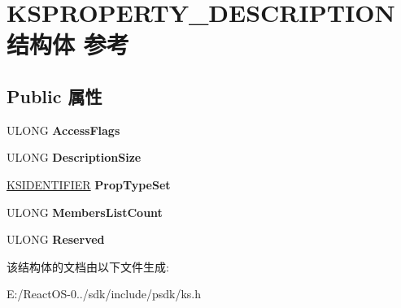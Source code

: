\hypertarget{struct_k_s_p_r_o_p_e_r_t_y___d_e_s_c_r_i_p_t_i_o_n}{}\section{K\+S\+P\+R\+O\+P\+E\+R\+T\+Y\+\_\+\+D\+E\+S\+C\+R\+I\+P\+T\+I\+O\+N结构体 参考}
\label{struct_k_s_p_r_o_p_e_r_t_y___d_e_s_c_r_i_p_t_i_o_n}
\subsection*{Public 属性}
\begin{DoxyCompactItemize}
\item 
\mbox{\label{struct_k_s_p_r_o_p_e_r_t_y___d_e_s_c_r_i_p_t_i_o_n_a9e931183967a877613638f1cb2b29eb6}} 
U\+L\+O\+NG {\bfseries Access\+Flags}
\item 
\mbox{\label{struct_k_s_p_r_o_p_e_r_t_y___d_e_s_c_r_i_p_t_i_o_n_a500a1671b6931c3482b811f70ca84398}} 
U\+L\+O\+NG {\bfseries Description\+Size}
\item 
\mbox{\label{struct_k_s_p_r_o_p_e_r_t_y___d_e_s_c_r_i_p_t_i_o_n_a85872a0db90034b720592d555b15369a}} 
\hyperlink{struct_k_s_i_d_e_n_t_i_f_i_e_r}{K\+S\+I\+D\+E\+N\+T\+I\+F\+I\+ER} {\bfseries Prop\+Type\+Set}
\item 
\mbox{\label{struct_k_s_p_r_o_p_e_r_t_y___d_e_s_c_r_i_p_t_i_o_n_a8b8a6e033864e7ce5fe67ce6803c5e13}} 
U\+L\+O\+NG {\bfseries Members\+List\+Count}
\item 
\mbox{\label{struct_k_s_p_r_o_p_e_r_t_y___d_e_s_c_r_i_p_t_i_o_n_ae4fe02efb0464f5b30255f6fd4ef2d45}} 
U\+L\+O\+NG {\bfseries Reserved}
\end{DoxyCompactItemize}


该结构体的文档由以下文件生成\+:\begin{DoxyCompactItemize}
\item 
E\+:/\+React\+O\+S-\/0../sdk/include/psdk/ks.\+h\end{DoxyCompactItemize}
